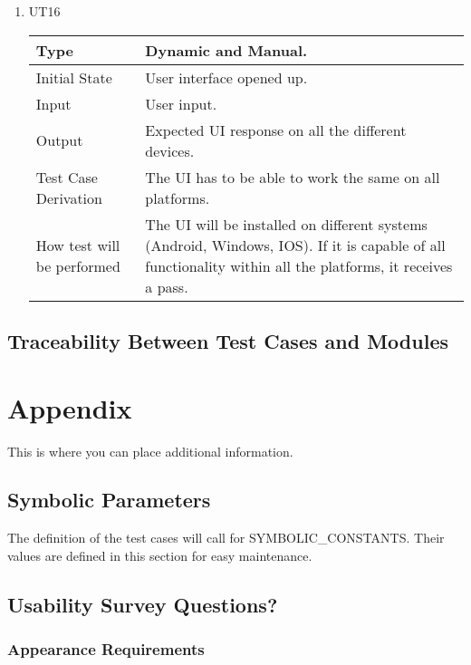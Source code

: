 \documentclass[12pt, titlepage]{article}
\begin{document}
\begin{enumerate}
\item{UT16\\}

\begin{tabular}{ |p{5cm}||p{7cm}| }
    \hline
    Type & Dynamic and Manual. \\
    \hline
    Initial State  &  User interface opened up. \\
    \hline
    Input &   User input. \\
    \hline
    Output &   Expected UI response on all the different devices.  \\
    \hline
    Test Case Derivation &   The UI has to be able to work the same on all platforms. \\
    \hline
    How test will be performed & The UI will be installed on different systems (Android, Windows, IOS). If it is capable of all functionality within all the platforms, it receives a pass. \\
    \hline
\end{tabular}

\end{enumerate}


\subsection{Traceability Between Test Cases and Modules}


\newpage

\section{Appendix}

This is where you can place additional information.

\subsection{Symbolic Parameters}

The definition of the test cases will call for SYMBOLIC\_CONSTANTS.
Their values are defined in this section for easy maintenance.

\subsection{Usability Survey Questions?}

\subsubsection{Appearance Requirements}
\end{document}
